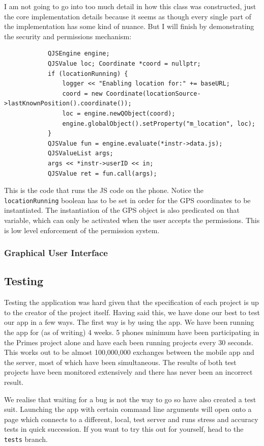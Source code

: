 \documentclass{article}
\begin{document}
I am not going to go into too much detail in how this class was constructed, just the core implementation details because it seems
as though every single part of the implementation has some kind of nuance. But I will finish by demonstrating the security and permissions
mechanism:
\begin{verbatim}
            QJSEngine engine;
            QJSValue loc; Coordinate *coord = nullptr;
            if (locationRunning) {
                logger << "Enabling location for:" += baseURL;
                coord = new Coordinate(locationSource->lastKnownPosition().coordinate());
                loc = engine.newQObject(coord);
                engine.globalObject().setProperty("m_location", loc);
            }
            QJSValue fun = engine.evaluate(*instr->data.js);
            QJSValueList args;
            args << *instr->userID << in;
            QJSValue ret = fun.call(args);
\end{verbatim}
This is the code that runs the JS code on the phone. Notice the \texttt{locationRunning} boolean has to be set in order for the
GPS coordinates to be instantiated. The instantiation of the GPS object is also predicated on that variable, which can only be activated
when the user accepts the permissions. This is low level enforcement of the permission system.

\subsubsection{Graphical User Interface}
\subsection{Testing}
Testing the application was hard given that the specification of each project is up to the creator of the project itself. Having said this,
we have done our best to test our app in a few ways. The first way is by using the app. We have been running the app for (as of writing)
4 weeks. 5 phones minimum have been participating in the Primes project alone and have each been running projects every 30 seconds.
This works out to be almost 100,000,000 exchanges between the mobile app and the server, most of which have been simultaneous. The results
of both test projects have been monitored extensively and there has never been an incorrect result.

We realise that waiting for a bug is not the way to go so have also created a test suit. Launching the app with certain command line
arguments will open onto a page which connects to a different, local, test server and runs stress and accuracy tests in quick succession.
If you want to try this out for yourself, head to the \texttt{tests} branch.
\end{document}
